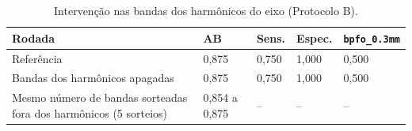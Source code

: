 \begin{table}[H]
\centering
\caption{Intervenção nas bandas dos harmônicos do eixo (Protocolo B).}
\label{tab:harmonicos}
\begin{tabularx}{\textwidth}{X C{1.8cm} C{1.6cm} C{1.6cm} C{2.2cm}}
\toprule
\textbf{Rodada} & \textbf{AB} & \textbf{Sens.} & \textbf{Espec.} & \textbf{\texttt{bpfo\_0.3mm}} \\
\midrule
Referência & 0,875 & 0,750 & 1,000 & 0,500 \\
Bandas dos harmônicos apagadas & 0,875 & 0,750 & 1,000 & 0,500 \\
Mesmo número de bandas sorteadas fora dos harmônicos (5 sorteios) & 0,854 a 0,875 & -- & -- & -- \\
\bottomrule
\end{tabularx}
\end{table}

